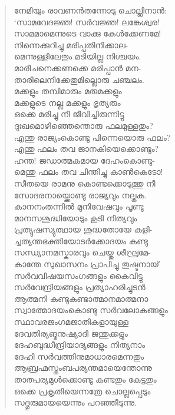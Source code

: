 \begin{verse}
നേമിയും രാവണന്‍തന്നോടു ചൊല്ലിനാന്‍:\\
‘സാമവേദജ്ഞ! സര്‍വജ്ഞ! ലങ്കേശ്വര!\\
സാമമാമെന്നുടെ വാക്കു കേള്‍ക്കേണമേ!\\
നിന്നെക്കുറിച്ചു മരിപ്പതിനിക്കാല-\\
മെന്നുള്ളിലേതും മടിയില്ല നിശ്ചയം.\\
മാരീചനെക്കണക്കെ മരിപ്പാന്‍ മന-\\
താരിലെനിക്കേതുമില്ലൊരു ചഞ്ചലം.\\
മക്കളും തമ്പിമാരും മരുമക്കളും\\
മക്കളുടെ നല്ല മക്കളും ഭൃത്യരും\\
ഒക്കെ മരിച്ചു നീ ജീവിച്ചിരുന്നിട്ടു\\
ദുഃഖമൊഴിഞ്ഞെന്തൊരു ഫലമുള്ളതും?\\
എന്തു രാജ്യംകൊണ്ടു പിന്നെയൊരു ഫലം?\\
എന്തു ഫലം തവ ജാനകിയെക്കൊണ്ടും?\\
ഹന്ത! ജഡാത്മകമായ ദേഹംകൊണ്ടു-\\
മെന്തു ഫലം തവ ചിന്തിച്ചു കാണ്‍കെടോ!\\
സീതയെ രാമനു കൊണ്ടക്കൊടുത്തു നീ\\
സോദരനായ്ക്കൊണ്ടു രാജ്യവും നല്കുക.\\
കാനനംതന്നില്‍ മുനിവേഷവും പൂണ്ടു\\
മാനസശുദ്ധിയോടും കൂടി നിത്യവും\\
പ്രത്യുഷസ്യുത്ഥായ ശുദ്ധതോയേ കുളി-\\
ച്ചത്യന്തഭക്തിയോടര്‍ക്കോദയം കണ്ടു\\
സന്ധ്യാനമസ്കാരവും ചെയ്തു ശീഘ്രമേ-\\
കാന്തേ സുഖാസനം പ്രാപിച്ചു തുഷ്ടനായ്\\
സര്‍വവിഷയസംഗങ്ങളും കൈവിട്ടു\\
സര്‍വേന്ദ്രിയങ്ങളും പ്രത്യാഹരിച്ചുടന്‍\\
ആത്മനി കണ്ടുകണ്ടാത്മാനമാത്മനാ\\
സ്വാത്മോദയംകൊണ്ടു സര്‍വലോകങ്ങളും\\
സ്ഥാവരജംഗമജാതികളായുള്ള\\
ദേവതിര്യങ്മനുഷ്യാദി ജന്തുക്കളും\\
ദേഹബുദ്ധീന്ദ്രിയാദ്യങ്ങളും നിത്യനാം\\
ദേഹി സര്‍വത്തിനുമാധാരമെന്നതും\\
ആബ്രഹ്മസ്തംബപര്യന്തമായെന്തോന്നു\\
താത്പര്യമുള്‍ക്കൊണ്ടു കണ്ടതും കേട്ടതും\\
ഒക്കെ പ്രകൃതിയെന്നത്രേ ചൊല്ലപ്പെടും\\
സദ്ഗുരുമായയെന്നും പറഞ്ഞീടുന്നു.\\

\end{verse}
